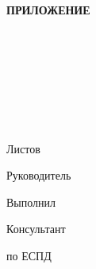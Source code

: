\begin{ESKDtitlePage}
    \begin{flushright}
        \textbf{ПРИЛОЖЕНИЕ \gpiPrilLetter} \enspace\enspace
    \end{flushright}
    \begin{center}
        \gpiEdu \\
        \gpiKaf \\
    \end{center}

    \vfill

    \begin{center}
        \gpiTopic \\
    \end{center}

    \vfill

    \begin{center}
        \textbf{\gpiDocTopic} \\
    \end{center}

    \vfill

    \begin{center}
        \gpiCode \\
        Листов \pageref{LastPage} \\
    \end{center}

    \vfill

    \begin{flushright}
        \begin{minipage}[t]{.49\textwidth}
            \begin{minipage}[t]{.75\textwidth}
                \begin{flushright}
                    Руководитель

                    Выполнил

                    Консультант

                    по ЕСПД
                \end{flushright}
            \end{minipage}
        \end{minipage}
        \begin{minipage}[t]{.49\textwidth}
            \begin{flushright}
                \begin{minipage}[t]{.75\textwidth}
                    \gpiTeacherName~\gpiTeacherSurname


\end{minipage}
\end{flushright}
\end{minipage}
\end{flushright}
\end{ESKDtitlePage}
